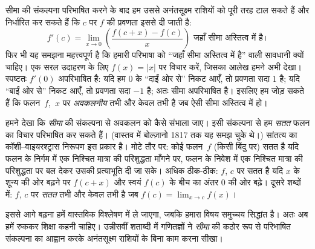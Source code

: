 \documentclass[../../../include/open-logic-section]{subfiles}
\begin{document}
सीमा की संकल्पना परिभाषित करने के बाद हम उससे अनंतसूक्ष्म राशियों को पूरी तरह
टाल सकते हैं और निर्धारित कर सकते हैं कि $c$ पर $f$ की प्रवणता इससे दी जाती
है:
\[
	{f}'(c) = \lim_{x \rightarrow 0}\left(\frac{f(c +x) - f(c)}{x}\right) \text{ जहाँ सीमा अस्तित्व में है}।
\]
फिर भी यह समझना महत्त्वपूर्ण है कि हमारी परिभाषा को ``जहाँ सीमा अस्तित्व में
है'' वाली सावधानी क्यों चाहिए। एक सरल उदाहरण के लिए $f(x) = |x|$ पर विचार
करें, जिसका आलेख हमने अभी देखा। स्पष्टतः $f'(0)$ अपरिभाषित है: यदि हम $0$ के
``दाईं ओर से'' निकट आएँ, तो प्रवणता सदा $1$ है; यदि ``बाईं ओर से'' निकट आएँ,
तो प्रवणता सदा $-1$ है; अतः सीमा अपरिभाषित है। इसलिए हम जोड़ सकते हैं कि
फलन~$f$,~$x$ पर \emph{अवकलनीय} तभी और केवल तभी है जब ऐसी सीमा अस्तित्व में
हो।

हमने देखा कि \emph{सीमा} की संकल्पना से अवकलन को कैसे संभाला जाए। इसी
संकल्पना से हम \emph{सतत} फलन का विचार परिभाषित कर सकते हैं। (वास्तव में
बोल्ज़ानो 1817 तक यह समझ चुके थे।) सांतत्य का कॉशी--वाइयरश्ट्रास निरूपण इस
प्रकार है। मोटे तौर पर: कोई फलन~$f$ (किसी बिंदु पर) सतत है यदि फलन के निर्गम
में एक निश्चित मात्रा की परिशुद्धता माँगने पर, फलन के निवेश में एक निश्चित
मात्रा की परिशुद्धता पर बल देकर उसकी प्रत्याभूति दी जा सके। अधिक ठीक-ठीक:
$f$, $c$ पर सतत है यदि $x$ के शून्य की ओर बढ़ने पर $f(c + x)$ और स्वयं
$f(c)$ के बीच का अंतर $0$ की ओर बढ़े। दूसरे शब्दों में: $f$, $c$ पर
\emph{सतत} तभी और केवल तभी है जब $f(c) = \lim_{x \rightarrow c} f(x)$।

इससे आगे बढ़ना हमें वास्तविक विश्लेषण में ले जाएगा, जबकि हमारा विषय समुच्चय
सिद्धांत है। अतः अब हमें रुककर शिक्षा कहनी चाहिए। उन्नीसवीं शताब्दी में
गणितज्ञों ने \emph{सीमा} की कठोर रूप से परिभाषित संकल्पना का आह्वान करके
अनंतसूक्ष्म राशियों के बिना काम करना सीखा।
\end{document}
